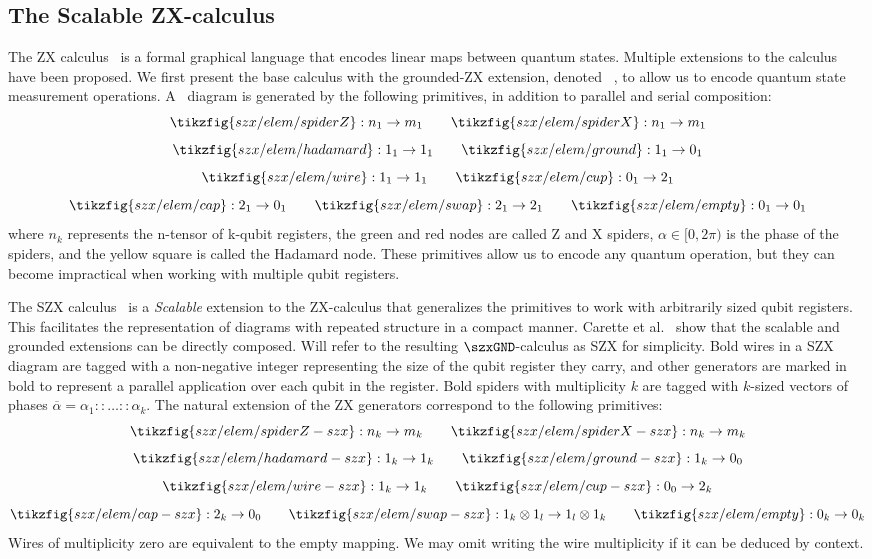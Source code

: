 \subsection{The Scalable ZX-calculus}%
\label{sec:szx}

The ZX calculus~\cite{vdw_working_cs_zx} is a formal graphical language
that encodes linear maps between quantum states.
Multiple extensions to the calculus have been proposed.
We first present the base calculus with the grounded-ZX extension,
denoted \zxGND~\cite{ground},
to allow us to encode quantum state measurement operations.
A \zxGND\ diagram is generated by the following primitives,
in addition to parallel and serial composition:
\[
    \tikzfig{szx/elem/spiderZ} : n_1 \to m_1
    \qquad
    \tikzfig{szx/elem/spiderX} : n_1 \to m_1
\]
\[
    \tikzfig{szx/elem/hadamard} : 1_1 \to 1_1
    \qquad
    \tikzfig{szx/elem/ground} : 1_1 \to 0_1
\]
\[
    \tikzfig{szx/elem/wire} : 1_1 \to 1_1
    \qquad
    \tikzfig{szx/elem/cup} : 0_1 \to 2_1
\]
\[
    \tikzfig{szx/elem/cap} : 2_1 \to 0_1
    \qquad
    \tikzfig{szx/elem/swap} : 2_1 \to 2_1
    \qquad
    \tikzfig{szx/elem/empty} : 0_1 \to 0_1
\]
where $n_k$ represents the n-tensor of k-qubit registers,
the green and red nodes are called Z and X spiders,
$\alpha \in [0,2\pi)$ is the phase of the spiders,
and the yellow square is called the Hadamard node.
These primitives allow us to encode any quantum operation,
but they can become impractical when working with multiple qubit registers.

The SZX calculus~\cite{carette_szx-calculus_2019,carette_quantum_2021}
is a \textit{Scalable} extension to the ZX-calculus
that generalizes the primitives to work with arbitrarily sized qubit registers.
This facilitates the representation of diagrams with repeated structure
in a compact manner. 
Carette et al.~\cite{carette_quantum_2021} show that the scalable and grounded extensions
can be directly composed.
Will refer to the resulting $\szxGND$-calculus as SZX for simplicity.
%
Bold wires in a SZX diagram are tagged with a non-negative integer representing
the size of the qubit register they carry, and other generators are marked in bold 
to represent a parallel application over each qubit in the register.
Bold spiders with multiplicity $k$ are tagged with $k$-sized vectors of phases
$\overline\alpha = \alpha_1 :: \dots :: \alpha_k$.
The natural extension of the ZX generators correspond to the following primitives:
\[
    \tikzfig{szx/elem/spiderZ-szx} : n_k \to m_k
    \qquad
    \tikzfig{szx/elem/spiderX-szx} : n_k \to m_k
\]
\[
    \tikzfig{szx/elem/hadamard-szx} : 1_k \to 1_k
    \qquad
    \tikzfig{szx/elem/ground-szx} : 1_k \to 0_0
\]
\[
    \tikzfig{szx/elem/wire-szx} : 1_k \to 1_k
    \qquad
    \tikzfig{szx/elem/cup-szx} : 0_0 \to 2_k
\]
\[
    \tikzfig{szx/elem/cap-szx} : 2_k \to 0_0
    \qquad
    \tikzfig{szx/elem/swap-szx} : 1_k \otimes 1_l \to 1_l \otimes 1_k
    \qquad
    \tikzfig{szx/elem/empty} : 0_k \to 0_k
\]
Wires of multiplicity zero are equivalent to the empty mapping.
We may omit writing the wire multiplicity if it can be deduced by context. 

